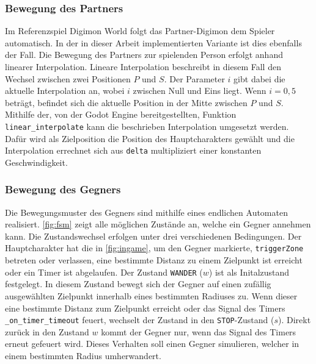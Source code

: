 \subsubsection{Bewegung des Partners}
Im Referenzspiel Digimon World folgt das Partner-Digimon dem Spieler automatisch. In der in dieser Arbeit implementierten Variante ist dies ebenfalls der Fall. Die Bewegung des Partners zur spielenden Person erfolgt anhand linearer Interpolation. Lineare Interpolation beschreibt in diesem Fall den Wechsel zwischen zwei Positionen $P$ und $S$. Der Parameter $i$  gibt dabei die aktuelle Interpolation an, wobei $i$ zwischen Null und Eins liegt. Wenn $i=0{,}5$ beträgt, befindet sich die aktuelle Position in der Mitte zwischen $P$ und $S$. Mithilfe der, von der Godot Engine bereitgestellten, Funktion \texttt{linear\_interpolate} kann die beschrieben Interpolation umgesetzt werden. Dafür wird als Zielposition die Position des Hauptcharakters gewählt und die Interpolation errechnet sich aus \texttt{delta} multipliziert einer konstanten Geschwindigkeit. \\

\subsubsection{Bewegung des Gegners}
Die Bewegungsmuster des Gegners sind mithilfe eines endlichen Automaten realisiert. \autoref{fig:fsm} zeigt alle möglichen Zustände an, welche ein Gegner annehmen kann. Die Zustandswechsel erfolgen unter drei verschiedenen Bedingungen. Der Hauptcharakter hat die in \autoref{fig:ingame}, um den Gegner markierte, \texttt{triggerZone} betreten oder verlassen, eine bestimmte Distanz zu einem Zielpunkt ist erreicht oder ein Timer ist abgelaufen. Der Zustand \texttt{WANDER} ($w$) ist als Initalzustand festgelegt. In diesem Zustand bewegt sich der Gegner auf einen zufällig ausgewählten Zielpunkt innerhalb eines bestimmten Radiuses zu. Wenn dieser eine bestimmte Distanz zum Zielpunkt erreicht oder das Signal des Timers \texttt{\_on\_timer\_timeout} feuert, wechselt der Zustand in den \texttt{STOP}-Zustand ($s$). Direkt zurück in den Zustand $w$ kommt der Gegner nur, wenn das Signal des Timers erneut gefeuert wird. Dieses Verhalten soll einen Gegner simulieren, welcher in einem bestimmten Radius umherwandert. \\




